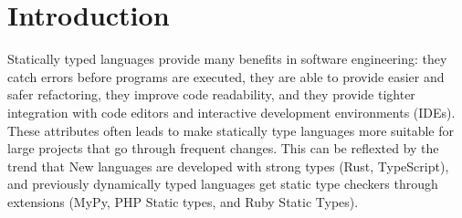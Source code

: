 \documentclass[pdflatex,sn-mathphys-num]{sn-jnl}%
\begin{document}
% 
% 
% 




\maketitle

\section{Introduction} \label{sec:introduction}
Statically typed languages provide many benefits in software engineering: they catch errors before programs are executed, they are able to provide easier and safer refactoring,  they improve code readability, and they provide tighter integration with code editors and interactive development environments (IDEs). These attributes often leads to make statically type languages more suitable for large projects that go through frequent changes. This can be reflexted by the trend that New languages are developed with strong types (Rust, TypeScript), and previously dynamically typed languages get static type checkers through extensions (MyPy, PHP Static types, and Ruby Static Types).
\end{document}

